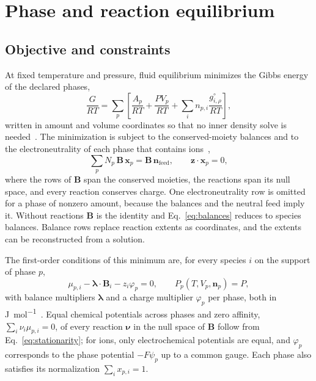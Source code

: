 \section{Phase and reaction equilibrium}
\label{sec:equilibrium}
\subsection{Objective and constraints}
At fixed temperature and pressure, fluid equilibrium minimizes the Gibbs energy of the declared phases,
\begin{equation}
\frac{G}{RT}=\sum_p\left[\frac{A_p}{RT}+\frac{PV_p}{RT}+\sum_i n_{p,i}\frac{g^{\circ}_{i,\rho}}{RT}\right],
\label{eq:gibbs}
\end{equation}
written in amount and volume coordinates so that no inner density solve is needed~\citep{Pereira2012}.
The minimization is subject to the conserved-moiety balances and to the electroneutrality of each phase that contains ions~\citep{Ascani2022,Tsanas2019,Tsanas2022},
\begin{equation}
\sum_pN_p\,\mathbf{B}\,\mathbf{x}_p=\mathbf{B}\,\mathbf{n}_{\mathrm{feed}},\qquad
\mathbf{z}\cdot\mathbf{x}_p=0,
\label{eq:balances}
\end{equation}
where the rows of $\mathbf{B}$ span the conserved moieties, the reactions span its null space, and every reaction conserves charge.
One electroneutrality row is omitted for a phase of nonzero amount, because the balances and the neutral feed imply it.
Without reactions $\mathbf{B}$ is the identity and Eq.~\eqref{eq:balances} reduces to species balances.
Balance rows replace reaction extents as coordinates, and the extents can be reconstructed from a solution.

The first-order conditions of this minimum are, for every species $i$ on the support of phase $p$,
\begin{equation}
\mu_{p,i}-\boldsymbol{\lambda}\cdot\mathbf{B}_i-z_i\varphi_p=0,\qquad P_p(T,V_p,\mathbf{n}_p)=P,
\label{eq:stationarity}
\end{equation}
with balance multipliers $\boldsymbol\lambda$ and a charge multiplier $\varphi_p$ per phase, both in \si{\joule\per\mol}~\citep{Ascani2022,Pereira2012}.
Equal chemical potentials across phases and zero affinity, $\sum_i\nu_i\mu_{p,i}=0$, of every reaction $\boldsymbol\nu$ in the null space of $\mathbf{B}$ follow from Eq.~\eqref{eq:stationarity}; for ions, only electrochemical potentials are equal, and $\varphi_p$ corresponds to the phase potential $-F\psi_p$ up to a common gauge.
Each phase also satisfies its normalization $\sum_ix_{p,i}=1$.

